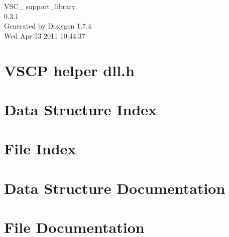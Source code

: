 \documentclass[a4paper]{book}
\begin{document}
\hypersetup{pageanchor=false}
\begin{titlepage}
\vspace*{7cm}
\begin{center}
{\Large VSC\_\- support\_\-library \\[1ex]\large 0.3.1 }\\
\vspace*{1cm}
{\large Generated by Doxygen 1.7.4}\\
\vspace*{0.5cm}
{\small Wed Apr 13 2011 10:44:37}\\
\end{center}
\end{titlepage}
\clearemptydoublepage
{}
\tableofcontents
\clearemptydoublepage
{}
\hypersetup{pageanchor=true}
\chapter{VSCP helper dll.h}
\label{index}\hypertarget{index}{}
\chapter{Data Structure Index}

\chapter{File Index}

\chapter{Data Structure Documentation}









\chapter{File Documentation}





\printindex
\end{document}
